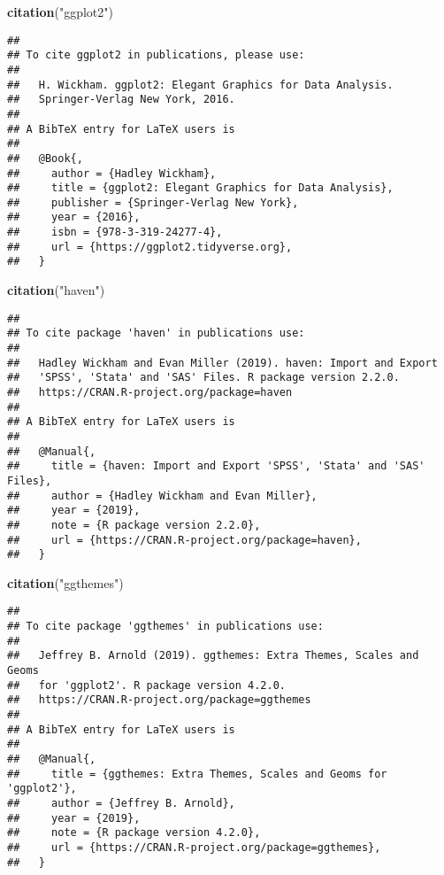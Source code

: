 \documentclass[
]{article}
\newenvironment{Shaded}{\begin{snugshade}}{\end{snugshade}}
\newcommand{\KeywordTok}[1]{\textcolor[rgb]{0.13,0.29,0.53}{\textbf{#1}}}
\newcommand{\NormalTok}[1]{#1}
\newcommand{\StringTok}[1]{\textcolor[rgb]{0.31,0.60,0.02}{#1}}
\begin{document}
\begin{Shaded}
\begin{Highlighting}[]
\KeywordTok{citation}\NormalTok{(}\StringTok{"ggplot2"}\NormalTok{)}
\end{Highlighting}
\end{Shaded}

\begin{verbatim}
## 
## To cite ggplot2 in publications, please use:
## 
##   H. Wickham. ggplot2: Elegant Graphics for Data Analysis.
##   Springer-Verlag New York, 2016.
## 
## A BibTeX entry for LaTeX users is
## 
##   @Book{,
##     author = {Hadley Wickham},
##     title = {ggplot2: Elegant Graphics for Data Analysis},
##     publisher = {Springer-Verlag New York},
##     year = {2016},
##     isbn = {978-3-319-24277-4},
##     url = {https://ggplot2.tidyverse.org},
##   }
\end{verbatim}

\begin{Shaded}
\begin{Highlighting}[]
\KeywordTok{citation}\NormalTok{(}\StringTok{"haven"}\NormalTok{)}
\end{Highlighting}
\end{Shaded}

\begin{verbatim}
## 
## To cite package 'haven' in publications use:
## 
##   Hadley Wickham and Evan Miller (2019). haven: Import and Export
##   'SPSS', 'Stata' and 'SAS' Files. R package version 2.2.0.
##   https://CRAN.R-project.org/package=haven
## 
## A BibTeX entry for LaTeX users is
## 
##   @Manual{,
##     title = {haven: Import and Export 'SPSS', 'Stata' and 'SAS' Files},
##     author = {Hadley Wickham and Evan Miller},
##     year = {2019},
##     note = {R package version 2.2.0},
##     url = {https://CRAN.R-project.org/package=haven},
##   }
\end{verbatim}

\begin{Shaded}
\begin{Highlighting}[]
\KeywordTok{citation}\NormalTok{(}\StringTok{"ggthemes"}\NormalTok{)}
\end{Highlighting}
\end{Shaded}

\begin{verbatim}
## 
## To cite package 'ggthemes' in publications use:
## 
##   Jeffrey B. Arnold (2019). ggthemes: Extra Themes, Scales and Geoms
##   for 'ggplot2'. R package version 4.2.0.
##   https://CRAN.R-project.org/package=ggthemes
## 
## A BibTeX entry for LaTeX users is
## 
##   @Manual{,
##     title = {ggthemes: Extra Themes, Scales and Geoms for 'ggplot2'},
##     author = {Jeffrey B. Arnold},
##     year = {2019},
##     note = {R package version 4.2.0},
##     url = {https://CRAN.R-project.org/package=ggthemes},
##   }
\end{verbatim}
\end{document}
